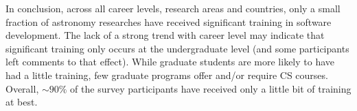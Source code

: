 In conclusion, across all career levels, research areas and countries, only a small fraction of astronomy researches have received significant training in software development. The lack of a strong trend with career level may indicate that significant training only occurs at the undergraduate level (and some participants left comments to that effect). While graduate students are more likely to have had a little training, few graduate programs offer and/or require CS courses.   Overall, $\sim90\%$ of the survey participants have received only a little bit of training at best. 


